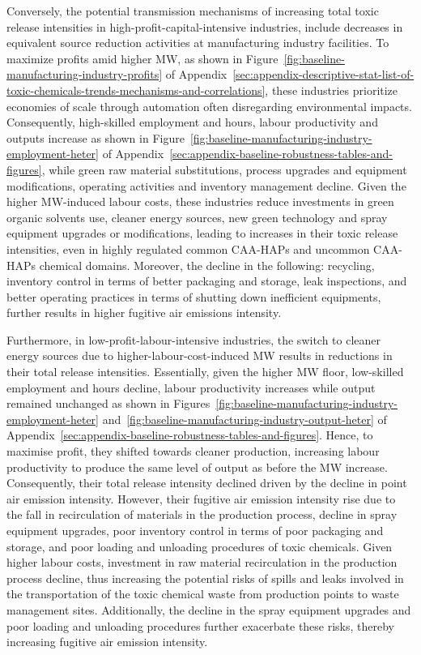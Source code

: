 \documentclass[12pt, english]{article}
\begin{document}
    Conversely, the potential transmission mechanisms of increasing total toxic release intensities in high-profit-capital-intensive industries, include decreases in equivalent source reduction activities at manufacturing industry facilities. To maximize profits amid higher MW, as shown in Figure~\ref{fig:baseline-manufacturing-industry-profits} of Appendix~\ref{sec:appendix-descriptive-stat-list-of-toxic-chemicals-trends-mechanisms-and-correlations}, these industries prioritize economies of scale through automation often disregarding environmental impacts. Consequently, high-skilled employment and hours, labour productivity and outputs increase as shown in Figure~\ref{fig:baseline-manufacturing-industry-employment-heter} of Appendix~\ref{sec:appendix-baseline-robustness-tables-and-figures}, while green raw material substitutions, process upgrades and equipment modifications, operating activities and inventory management decline. Given the higher MW-induced labour costs, these industries reduce investments in green organic solvents use, cleaner energy sources, new green technology and spray equipment upgrades or modifications, leading to increases in their toxic release intensities, even in highly regulated common CAA-HAPs and uncommon CAA-HAPs chemical domains. Moreover, the decline in the following: recycling, inventory control in terms of better packaging and storage, leak inspections, and better operating practices in terms of shutting down inefficient equipments, further results in higher fugitive air emissions intensity.
    

    Furthermore, in low-profit-labour-intensive industries, the switch to cleaner energy sources due to higher-labour-cost-induced MW results in reductions in their total release intensities. Essentially, given the higher MW floor, low-skilled employment and hours decline, labour productivity increases while output remained unchanged as shown in Figures~\ref{fig:baseline-manufacturing-industry-employment-heter} and~\ref{fig:baseline-manufacturing-industry-output-heter} of Appendix~\ref{sec:appendix-baseline-robustness-tables-and-figures}. Hence, to maximise profit, they shifted towards cleaner production, increasing labour productivity to produce the same level of output as before the MW increase. Consequently, their total release intensity declined driven by the decline in point air emission intensity. However, their fugitive air emission intensity rise due to the fall in recirculation of materials in the production process, decline in spray equipment upgrades, poor inventory control in terms of poor packaging and storage, and poor loading and unloading procedures of toxic chemicals. Given higher labour costs, investment in raw material recirculation in the production process decline, thus increasing the potential risks of spills and leaks involved in the transportation of the toxic chemical waste from production points to waste management sites. Additionally, the decline in the spray equipment upgrades and poor loading and unloading procedures further exacerbate these risks, thereby increasing fugitive air emission intensity.
\end{document}
